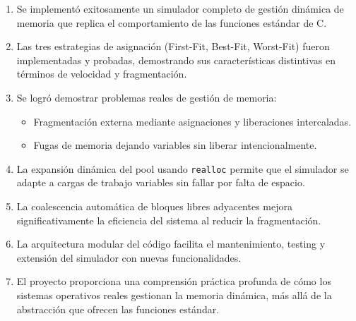 \documentclass[12pt,a4paper]{article}
\begin{document}
\begin{enumerate}
    \item Se implementó exitosamente un simulador completo de gestión dinámica de memoria que replica el comportamiento de las funciones estándar de C.
    
    \item Las tres estrategias de asignación (First-Fit, Best-Fit, Worst-Fit) fueron implementadas y probadas, demostrando sus características distintivas en términos de velocidad y fragmentación.
    
    \item Se logró demostrar problemas reales de gestión de memoria:
    \begin{itemize}
        \item Fragmentación externa mediante asignaciones y liberaciones intercaladas.
        \item Fugas de memoria dejando variables sin liberar intencionalmente.
    \end{itemize}
    
    \item La expansión dinámica del pool usando \texttt{realloc} permite que el simulador se adapte a cargas de trabajo variables sin fallar por falta de espacio.
    
    \item La coalescencia automática de bloques libres adyacentes mejora significativamente la eficiencia del sistema al reducir la fragmentación.
    
    \item La arquitectura modular del código facilita el mantenimiento, testing y extensión del simulador con nuevas funcionalidades.
    
    \item El proyecto proporciona una comprensión práctica profunda de cómo los sistemas operativos reales gestionan la memoria dinámica, más allá de la abstracción que ofrecen las funciones estándar.
\end{enumerate}
\end{document}
